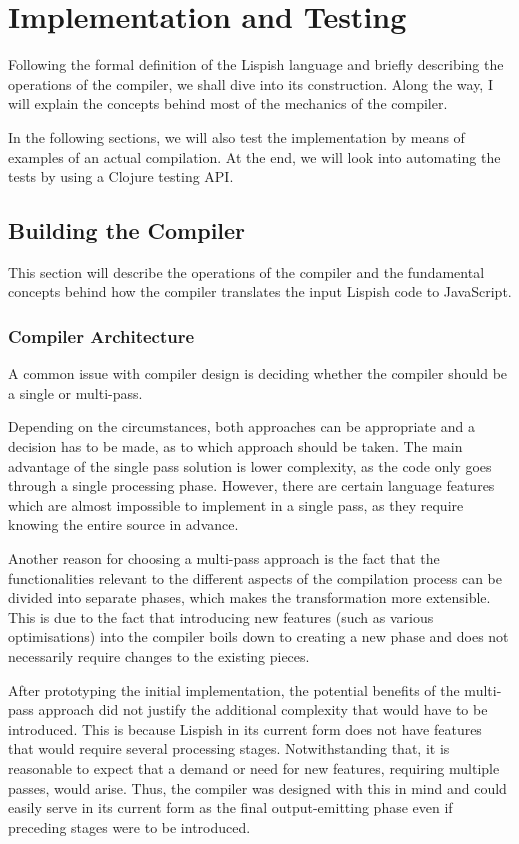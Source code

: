 \chapter{Implementation and Testing}
Following the formal definition of the Lispish language and briefly describing the operations of the compiler, we shall dive into its construction. Along the way, I will explain the concepts behind most of the mechanics of the compiler. 

In the following sections, we will also test the implementation by means of examples of an actual compilation. 
At the end, we will look into automating the tests by using a Clojure testing API.  

\section{Building the Compiler}
This section will describe the operations of the compiler and the fundamental concepts behind how the compiler translates the input Lispish code to JavaScript. 

\subsection{Compiler Architecture}
A common issue with compiler design is deciding whether the compiler should be a single or multi-pass.

Depending on the circumstances, both approaches can be appropriate 
and a decision has to be made, as to which approach should be taken.
The main advantage of the single pass solution is lower complexity, 
as the code only goes through a single processing phase.
However, there are certain language features which are almost impossible to implement in a single pass, as they require knowing the entire source in advance.

Another reason for choosing a multi-pass approach is the fact that the functionalities relevant to the different aspects of the compilation process can be divided into separate phases, which makes the transformation more extensible. This is due to the fact that introducing new features (such as various optimisations) into the compiler boils down to creating a new phase and does not necessarily require changes to the existing pieces.

After prototyping the initial implementation, the potential benefits of the multi-pass approach did not justify the additional complexity that would have to be introduced. This is because Lispish in its current form does not have features that would require several processing stages. 
Notwithstanding that, it is reasonable to expect that a demand or need for new features, requiring multiple passes, would arise. Thus, the compiler was designed with this in mind and could easily serve in its current form as the final output-emitting phase even if preceding stages were to be introduced.

